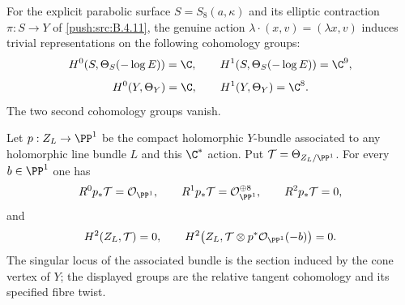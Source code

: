 \begin{proposition}\hypertarget{tag-030I}{}\label{push:src:B.4.14}

For the explicit parabolic surface $S=S_8(a,\kappa)$ and its
elliptic contraction $\pi:S\to Y$ of \ref{push:src:B.4.11}, the genuine action
$\lambda\cdot(x,v)=(\lambda x,v)$ induces trivial representations
on the following cohomology groups:
\[
 H^0(S,\Theta_S(-\log E))=\C,\qquad
 H^1(S,\Theta_S(-\log E))=\C^9,
\]
\[
 H^0(Y,\Theta_Y)=\C,\qquad H^1(Y,\Theta_Y)=\C^8.
\]
The two second cohomology groups vanish.

Let $p:Z_L\to\PP^1$ be the compact holomorphic $Y$-bundle
associated to any holomorphic line bundle $L$ and this
$\C^*$ action.  Put
$\mathcal T=\Theta_{Z_L/\PP^1}$.
For every $b\in\PP^1$ one has
\[
 R^0p_*\mathcal T=\mathcal O_{\PP^1},\qquad
 R^1p_*\mathcal T=\mathcal O_{\PP^1}^{\oplus8},\qquad
 R^2p_*\mathcal T=0,
\]
and
\[
 H^2(Z_L,\mathcal T)=0,
 \qquad
 H^2\bigl(Z_L,\mathcal T\otimes
                   p^*\mathcal O_{\PP^1}(-b)\bigr)=0.
\]
The singular locus of the associated bundle is the section induced
by the cone vertex of $Y$; the displayed groups are the relative
tangent cohomology and its specified fibre twist.
\end{proposition}


